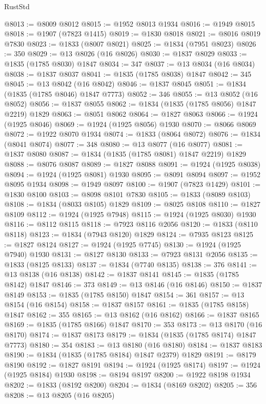 \begin{lexlean}{RustStd}
\begin{coremodule}
@8013 := @8009 @8012
@8015 := @1952 @8013 @1934
@8016 := @1949 @8015
@8018 := @1907 (@7823 @1415)
@8019 := @1830 @8018
@8021 := @8016 @8019 @7830
@8023 := @1833 (@8007 @8021)
@8025 := @1834 (@7951 @8023)
@8026 := 350
@8029 := @13 @8026 (@16 @8026)
@8030 := @1837 @8029
@8033 := @1835 (@1785 @8030) @1847
@8034 := 347
@8037 := @13 @8034 (@16 @8034)
@8038 := @1837 @8037
@8041 := @1835 (@1785 @8038) @1847
@8042 := 345
@8045 := @13 @8042 (@16 @8042)
@8046 := @1837 @8045
@8051 := @1834 (@1835 (@1785 @8046) @1847 @7773)
@8052 := 346
@8055 := @13 @8052 (@16 @8052)
@8056 := @1837 @8055
@8062 := @1834 (@1835 (@1785 @8056) @1847 @2219) @1829
@8063 := @8051 @8062
@8064 := @1827 @8063
@8066 := @1924 (@1925 @8046)
@8069 := @1924 (@1925 @8056) @1930
@8070 := @8066 @8069
@8072 := @1922 @8070 @1934
@8074 := @1833 (@8064 @8072)
@8076 := @1834 (@8041 @8074)
@8077 := 348
@8080 := @13 @8077 (@16 @8077)
@8081 := @1837 @8080
@8087 := @1834 (@1835 (@1785 @8081) @1847 @2219) @1829
@8088 := @8076 @8087
@8089 := @1827 @8088
@8091 := @1924 (@1925 @8038)
@8094 := @1924 (@1925 @8081) @1930
@8095 := @8091 @8094
@8097 := @1952 @8095 @1934
@8098 := @1949 @8097
@8100 := @1907 (@7823 @1429)
@8101 := @1830 @8100
@8103 := @8098 @8101 @7830
@8105 := @1833 (@8089 @8103)
@8108 := @1834 (@8033 @8105) @1829
@8109 := @8025 @8108
@8110 := @1827 @8109
@8112 := @1924 (@1925 @7948)
@8115 := @1924 (@1925 @8030) @1930
@8116 := @8112 @8115
@8118 := @7923 @8116 @2056
@8120 := @1833 (@8110 @8118)
@8123 := @1834 (@7943 @8120) @1829
@8124 := @7935 @8123
@8125 := @1827 @8124
@8127 := @1924 (@1925 @7745)
@8130 := @1924 (@1925 @7940) @1930
@8131 := @8127 @8130
@8133 := @7923 @8131 @2056
@8135 := @1833 (@8125 @8133)
@8137 := @1834 (@7740 @8135)
@8138 := 376
@8141 := @13 @8138 (@16 @8138)
@8142 := @1837 @8141
@8145 := @1835 (@1785 @8142) @1847
@8146 := 373
@8149 := @13 @8146 (@16 @8146)
@8150 := @1837 @8149
@8153 := @1835 (@1785 @8150) @1847
@8154 := 361
@8157 := @13 @8154 (@16 @8154)
@8158 := @1837 @8157
@8161 := @1835 (@1785 @8158) @1847
@8162 := 355
@8165 := @13 @8162 (@16 @8162)
@8166 := @1837 @8165
@8169 := @1835 (@1785 @8166) @1847
@8170 := 353
@8173 := @13 @8170 (@16 @8170)
@8174 := @1837 @8173
@8179 := @1834 (@1835 (@1785 @8174) @1847 @7773)
@8180 := 354
@8183 := @13 @8180 (@16 @8180)
@8184 := @1837 @8183
@8190 := @1834 (@1835 (@1785 @8184) @1847 @2379) @1829
@8191 := @8179 @8190
@8192 := @1827 @8191
@8194 := @1924 (@1925 @8174)
@8197 := @1924 (@1925 @8184) @1930
@8198 := @8194 @8197
@8200 := @1922 @8198 @1934
@8202 := @1833 (@8192 @8200)
@8204 := @1834 (@8169 @8202)
@8205 := 356
@8208 := @13 @8205 (@16 @8205)

\end{coremodule}
\end{lexlean}
